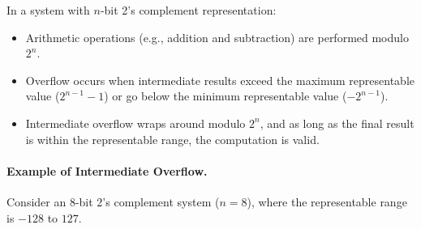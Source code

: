 In a system with \( n \)-bit 2's complement representation:
\begin{itemize}
    \item Arithmetic operations (e.g., addition and subtraction) are performed modulo \( 2^n \).
    \item Overflow occurs when intermediate results exceed the maximum representable value (\( 2^{n-1} - 1 \)) or go below the minimum representable value (\( -2^{n-1} \)).
    \item Intermediate overflow wraps around modulo \( 2^n \), and as long as the final result is within the representable range, the computation is valid.
\end{itemize}

\paragraph{Example of Intermediate Overflow.}
Consider an 8-bit 2's complement system (\( n = 8 \)), where the representable range is \( -128 \) to \( 127 \).

